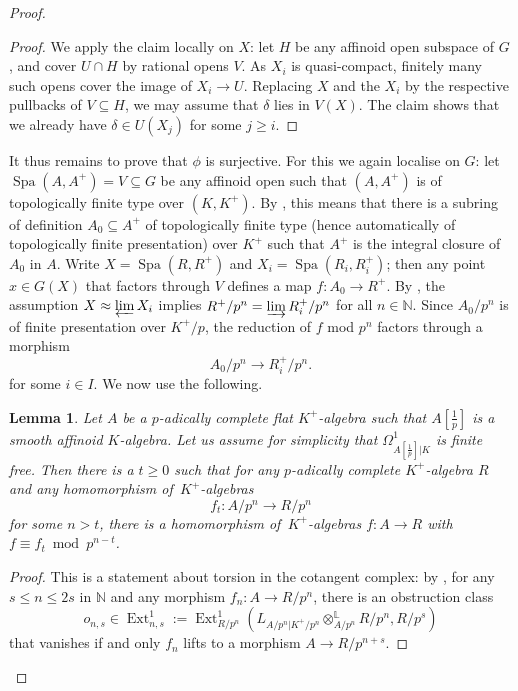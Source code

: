 \documentclass[10pt,a4paper]{article}
\newtheorem{Lemma}[thm]{Lemma}
\theoremstyle{definition}
\theoremstyle{remark}
\newcommand{\lra}{\longrightarrow}
\newcommand{\N}{\mathbb{N}}
\newcommand{\Spa}{\operatorname{Spa}}
\newcommand{\tf}{[\tfrac{1}{p}]}
\newcommand{\Ext}{\operatorname{Ext}}
\numberwithin{equation}{section}
\begin{document}
\begin{proof}
\begin{proof}
        We apply the claim locally on $X$: let $H$ be any affinoid open subspace of $G$, and cover $U\cap H$ by rational opens $V$. As $X_i$ is quasi-compact, finitely many such opens cover the image of $X_i\to U$. Replacing $X$ and the $X_i$ by the respective pullbacks of $V\subseteq H$, we may assume that $\delta$ lies in $V(X)$. The claim shows that we already have $\delta\in U(X_j)$ for some $j\geq i$.
	 \end{proof}

        It thus remains to prove that $\phi$ is surjective. For this we again localise on $G$: let $\Spa(A,A^+)=V\subseteq G$ be any affinoid open such that $(A,A^+)$ is of topologically finite type over $(K,K^+)$. By \cite[Lemma~3.3(ii)]{Huber-ageneralisation}, this means that there is a subring of definition $A_0\subseteq A^+$ of topologically finite type (hence automatically of topologically finite presentation) over $K^+$ such that $A^+$ is the integral closure of $A_0$ in $A$.
 	 Write $X=\Spa(R,R^+)$ and $X_i=\Spa(R_i,R^+_i)$; then any point $x\in G(X)$ that factors through $V$ defines a map $f\colon A_0\to R^+$. By \cite[Lemma~3.10]{heuer-diamantine-Picard}, the assumption $X\approx \varprojlim X_i$ implies $R^+/p^n=\varinjlim R^+_i/p^n$ for all $n\in \N$. Since $A_0/p^n$ is of finite presentation over $K^+/p$, the reduction of $f$ mod $p^n$ factors through a morphism
 	\[ A_0/p^n\lra R_i^+/p^n.\]
 	for some $i\in I$. We now use the following. 
        
 	\begin{Lemma}\label{lem44}
 		Let $A$ be a  $p$-adically complete flat $K^+$-algebra such that $A\tf$ is a smooth affinoid $K$-algebra. Let us assume for simplicity that $\Omega^1_{A[\frac{1}{p}]|K}$ is finite free. Then there is a $t\geq 0$ such that for  any $p$-adically complete $K^+$-algebra $R$ and any homomorphism 
 		of\, $K^+$-algebras
 		\[f_t\colon A/p^n\lra R/p^n\]
 		for some $n>t$, there is a homomorphism of\, $K^+$-algebras $f\colon A\to R$ with $f\equiv f_t\bmod p^{n-t}$.
 	\end{Lemma}
        
 	\begin{proof}
 		This is a statement about torsion in the cotangent complex: by \cite[Proposition~III.2.2.4]{IllusieCotangent},  for any $s\leq n\leq 2s$ in $\N$ and any morphism
 		$f_n\colon A\to R/p^n$, there is 
 		 an obstruction class 
 		\[o_{n,s}\in \Ext_{n,s}^1:=\Ext^1_{R/p^n}\left(L_{A/p^n|K^+/p^n}\otimes_{A/p^n}^{\mathbb L}R/p^n,R/p^s\right)\]
 		that vanishes if and only $f_n$ lifts to a morphism $A\to R/p^{n+s}$.
                

\end{proof}
\end{proof}
\end{document}
